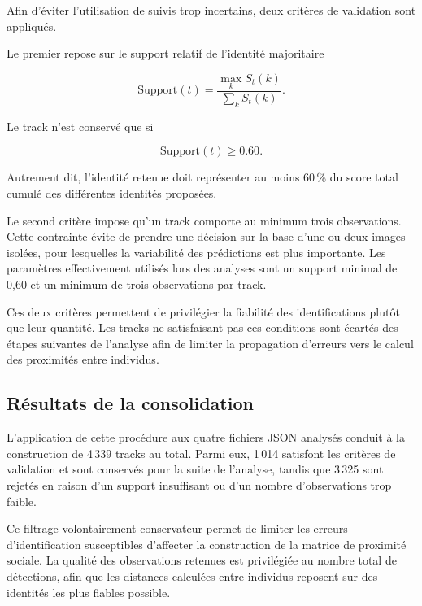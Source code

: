 \documentclass[11pt,a4paper]{report}
\begin{document}
Afin d'éviter l'utilisation de suivis trop incertains, deux critères de
validation sont appliqués.

Le premier repose sur le support relatif de l'identité majoritaire

\begin{equation}
\text{Support}(t)
=
\frac{\displaystyle
\max_k S_t(k)}
{\displaystyle
\sum_k S_t(k)}.
\end{equation}

Le track n'est conservé que si

\begin{equation}
\text{Support}(t)\geq0.60.
\end{equation}

Autrement dit, l'identité retenue doit représenter au moins 60\,\% du score
total cumulé des différentes identités proposées.

Le second critère impose qu'un track comporte au minimum trois observations.
Cette contrainte évite de prendre une décision sur la base d'une ou deux images
isolées, pour lesquelles la variabilité des prédictions est plus importante. Les
paramètres effectivement utilisés lors des analyses sont un support minimal de
0,60 et un minimum de trois observations par track. 

Ces deux critères permettent de privilégier la fiabilité des identifications
plutôt que leur quantité. Les tracks ne satisfaisant pas ces conditions sont
écartés des étapes suivantes de l'analyse afin de limiter la propagation
d'erreurs vers le calcul des proximités entre individus.

\subsection*{Résultats de la consolidation}

L'application de cette procédure aux quatre fichiers JSON analysés conduit à la
construction de 4\,339 tracks au total. Parmi eux, 1\,014 satisfont les critères
de validation et sont conservés pour la suite de l'analyse, tandis que
3\,325 sont rejetés en raison d'un support insuffisant ou d'un nombre
d'observations trop faible.

Ce filtrage volontairement conservateur permet de limiter les erreurs
d'identification susceptibles d'affecter la construction de la matrice de
proximité sociale. La qualité des observations retenues est privilégiée au
nombre total de détections, afin que les distances calculées entre individus
reposent sur des identités les plus fiables possible.
\end{document}
